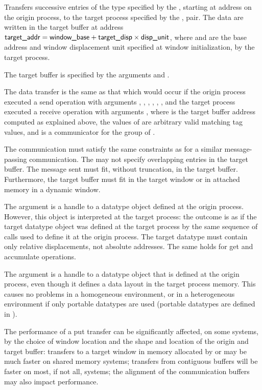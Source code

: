 Transfers 
successive entries of the type specified by the
, starting at address 
on the origin process, to the target process
specified by the ,  pair. 
The data are written in
the target buffer at address
$\mpiarg{target\_addr} = \mpiarg{window\_base} + 
\mpiarg{target\_disp}\times\mpiarg{disp\_unit}$, where
 and 
are the base address and window displacement unit
specified at window initialization, by the target process.

The target buffer is specified by the arguments
and .

The data transfer is the same as that which would occur
if the origin process executed a send
operation
with arguments , , 
,
, , , and the target
process executed a 
receive operation with arguments
, where
 is the target buffer address computed as
explained above, the values of  are arbitrary valid
matching tag values, and  is a communicator for the group of .

The communication must satisfy the same constraints as for a similar message-passing communication.  The  may not specify overlapping entries in the target buffer.
The message sent must fit, without truncation, in the target buffer.
Furthermore, the target buffer
must fit in the target window or in attached memory in a
dynamic window.

The  argument
is a handle to a datatype object defined at the origin process.
However, this object is interpreted at the target process: the outcome
is as if the target datatype object was defined at the target process
by the same sequence of calls used to define it at the origin process.
The target datatype must 
contain only relative displacements, not absolute addresses.
The same
holds for get and accumulate
operations.

\begin{users}
The  argument is a handle to a datatype
object
that is defined at the origin process, even though it defines a data
layout in
the target process memory.  This causes no problems in a homogeneous
environment, or in a heterogeneous environment if only portable
datatypes are used (portable datatypes are defined in
).

The performance of a put transfer can be significantly affected, on
some systems,
by the choice of window location and the shape and location
of the origin and target buffer: transfers to a target window in memory
allocated by  or  may be much faster on shared
memory systems;
transfers from contiguous buffers will be
faster on most, if not all, systems;  the alignment of the
communication buffers may also impact performance.
\end{users}

